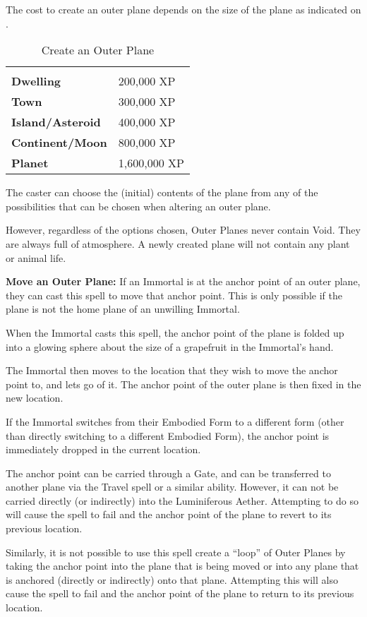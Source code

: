 \begin{multicols*}{2}
The cost to create an outer plane depends on the size of the plane as indicated on .

\begin {table}[H]
  \caption{Create an Outer Plane}\label{tab:Create an Outer Plane}
  \begin{tabularx}{\columnwidth}{>{\bfseries}YY}
	 & \\
	Dwelling & 200,000 XP\\
	Town & 300,000 XP\\
	Island/Asteroid & 400,000 XP\\
	Continent/Moon & 800,000 XP\\
	Planet & 1,600,000 XP
  \end {tabularx}
\end {table}

The caster can choose the (initial) contents of the plane from any of the possibilities that can be chosen when altering an outer plane.

However, regardless of the options chosen, Outer Planes never contain Void. They are always full of atmosphere.
A newly created plane will not contain any plant or animal life.

\textbf{Move an Outer Plane:} If an Immortal is at the anchor point of an outer plane, they can cast this spell to move that anchor point. This is only possible if the plane is not the home plane of an unwilling Immortal.

When the Immortal casts this spell, the anchor point of the plane is folded up into a glowing sphere about the size of a grapefruit in the Immortal’s hand.

The Immortal then moves to the location that they wish to move the anchor point to, and lets go of it. The anchor point of the outer plane is then fixed in the new location.

If the Immortal switches from their Embodied Form to a different form (other than directly switching to a different Embodied Form), the anchor point is immediately dropped in the current location.

The anchor point can be carried through a Gate, and can be transferred to another plane via the Travel spell or a similar ability. However, it can not be carried directly (or indirectly) into the Luminiferous Aether. Attempting to do so will cause the spell to fail and the anchor point of the plane to revert to its previous location.

Similarly, it is not possible to use this spell create a “loop” of Outer Planes by taking the anchor point into the plane that is being moved or into any plane that is anchored (directly or indirectly) onto that plane. Attempting this will also cause the spell to fail and the anchor point of the plane to return to its previous location.


\end{multicols*}

